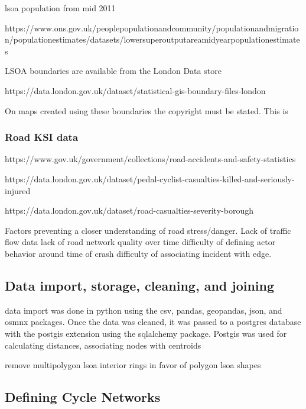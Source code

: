 \documentclass[11pt]{article} %
\begin{document}
lsoa population from mid 2011 

https://www.ons.gov.uk/peoplepopulationandcommunity/populationandmigration/populationestimates/datasets/lowersuperoutputareamidyearpopulationestimates

LSOA boundaries are available from the London Data store



https://data.london.gov.uk/dataset/statistical-gis-boundary-files-london

On maps created using these boundaries the copyright must be stated. This is

\subsubsection{Road KSI data}

https://www.gov.uk/government/collections/road-accidents-and-safety-statistics

https://data.london.gov.uk/dataset/pedal-cyclist-casualties-killed-and-seriously-injured

https://data.london.gov.uk/dataset/road-casualties-severity-borough

Factors preventing a closer understanding of road stress/danger. 
	Lack of traffic flow data
	lack of road network quality over time
	difficulty of defining actor behavior around time of crash
	difficulty of associating incident with edge.  

\subsection{Data import, storage, cleaning, and joining}

data import was done in python using the csv, pandas, geopandas, json, and osmnx packages. Once the data was cleaned, it was passed to a postgres database with the postgis extension using the sqlalchemy package. Postgis was used for calculating distances, associating nodes with centroids

remove multipolygon lsoa interior rings in favor of polygon lsoa shapes

\subsection{Defining Cycle Networks}
\end{document}
